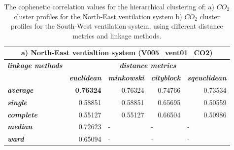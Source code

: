 \begin{table}[htbp]
  \centering
  \scriptsize
  \caption{The cophenetic correlation values for the hierarchical clustering of: a) $CO_2$ cluster profiles for the North-East ventilation system b) $CO_2$ cluster profiles for the South-West ventilation system, using different distance metrics and linkage methods.}
       \begin{tabular}{|l|r|r|r|r|}
    \hline
    \multicolumn{5}{|c|}{a) North-East ventialtion system (V005\_vent01\_CO2)} \bigstrut\\
    \hline
    \rowcolor[rgb]{ .851,  .851,  .851} \textit{\textbf{linkage methods}} & \multicolumn{4}{c|}{\cellcolor[rgb]{ .855,  .933,  .953} \textit{\textbf{distance metrics}}} \bigstrut\\
\cline{2-5}    \rowcolor[rgb]{ .851,  .851,  .851}      & \multicolumn{1}{c|}{\cellcolor[rgb]{ .855,  .933,  .953} \textit{\textbf{euclidean}}} & \multicolumn{1}{c|}{\cellcolor[rgb]{ .855,  .933,  .953} \textit{\textbf{minkowski}}} & \multicolumn{1}{c|}{\cellcolor[rgb]{ .855,  .933,  .953} \textit{\textbf{cityblock}}} & \multicolumn{1}{c|}{\cellcolor[rgb]{ .855,  .933,  .953} \textit{\textbf{sqeuclidean}}} \bigstrut\\
    \hline
    \rowcolor[rgb]{ .851,  .851,  .851} \textit{\textbf{average}} & \cellcolor[rgb]{ .573,  .816,  .314} \textbf{0.76324} & \cellcolor[rgb]{ 1,  1,  1} 0.76324 & \cellcolor[rgb]{ 1,  1,  1} 0.74766 & \cellcolor[rgb]{ 1,  1,  1} 0.73534 \bigstrut\\
    \hline
    \rowcolor[rgb]{ .851,  .851,  .851} \textit{\textbf{single}} & \cellcolor[rgb]{ 1,  1,  1} 0.58851 & \cellcolor[rgb]{ 1,  1,  1} 0.58851 & \cellcolor[rgb]{ 1,  1,  1} 0.65695 & \cellcolor[rgb]{ 1,  1,  1} 0.50559 \bigstrut\\
    \hline
    \rowcolor[rgb]{ .851,  .851,  .851} \textit{\textbf{complete}} & \cellcolor[rgb]{ 1,  1,  1} 0.55127 & \cellcolor[rgb]{ 1,  1,  1} 0.55127 & \cellcolor[rgb]{ 1,  1,  1} 0.66504 & \cellcolor[rgb]{ 1,  1,  1} 0.50986 \bigstrut\\
    \hline
    \rowcolor[rgb]{ .851,  .851,  .851} \textit{\textbf{median}} & \cellcolor[rgb]{ 1,  1,  1} 0.72623 & \multicolumn{1}{l|}{\cellcolor[rgb]{ 1,  1,  1} -} & \multicolumn{1}{l|}{\cellcolor[rgb]{ 1,  1,  1} -} & \multicolumn{1}{l|}{\cellcolor[rgb]{ 1,  1,  1} -} \bigstrut\\
    \hline
    \rowcolor[rgb]{ .851,  .851,  .851} \textit{\textbf{ward}} & \cellcolor[rgb]{ 1,  1,  1} 0.65094 & \multicolumn{1}{l|}{\cellcolor[rgb]{ 1,  1,  1} -} & \multicolumn{1}{l|}{\cellcolor[rgb]{ 1,  1,  1} -} & \multicolumn{1}{l|}{\cellcolor[rgb]{ 1,  1,  1} -} \bigstrut\\

\end{tabular}
\end{table}
